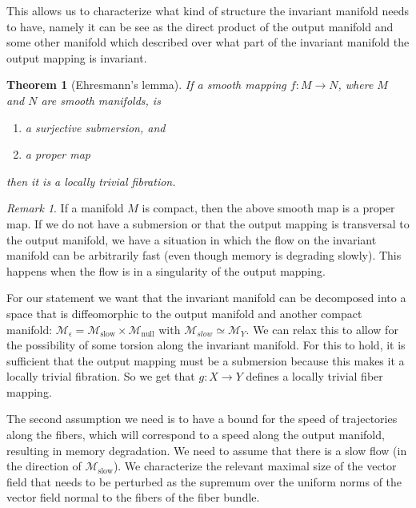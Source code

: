 \documentclass{article} %
\newcounter{ct}
\newcommand{\manifold}{\mathcal{M}}
\newtheorem{theorem}{Theorem}
\theoremstyle{definition}
\theoremstyle{remark}
\newtheorem{remark}{Remark}
\begin{document}
This allows us to characterize what kind of structure the invariant manifold needs to have, namely it can be see as the direct product of the output manifold and some other manifold which described over what part of the invariant manifold the output mapping is invariant.
\begin{theorem}[Ehresmann's lemma\citep{ehresmann1950connexions}]
If a smooth mapping \(f\colon M\rightarrow N\), where \(M\) and \(N\) are smooth manifolds, is
 \begin{enumerate}
\item a surjective submersion, and
\item a proper map
\end{enumerate}
then it is a locally trivial fibration.
\end{theorem}

\begin{remark}
If a manifold \(M\) is compact, then the above smooth map  is a proper map.
If we do not have a submersion or that the output mapping is transversal to the output manifold, we have a situation in which the flow on the invariant manifold can be arbitrarily fast  (even though memory is degrading slowly).
This happens when the flow is in a singularity of the output mapping.
\end{remark}

For our statement we want that the invariant manifold can be decomposed into a space that is diffeomorphic to the output manifold and another compact manifold: \(\manifold_{\epsilon}= \manifold_{\text{slow}}\times \manifold_{\text{null}}\) with \(\manifold_{slow}\simeq \manifold_{Y}\). We can relax this to allow for the possibility of some torsion along the invariant manifold.
For this to hold, it is sufficient that the output mapping must be a submersion because this makes it a locally trivial fibration.
So we get that \(g\colon X\rightarrow Y\) defines a locally trivial fiber mapping.


The second assumption we need is to have a bound for the speed of trajectories along the fibers, which will correspond to a speed along the output manifold, resulting in memory degradation.
We need to assume that there is a slow flow (in the direction of \(\manifold_\text{slow}\)).
We characterize the relevant maximal size of the vector field that needs to be perturbed as the  supremum over the uniform norms of the vector field normal to the fibers of the fiber bundle.
\end{document}
